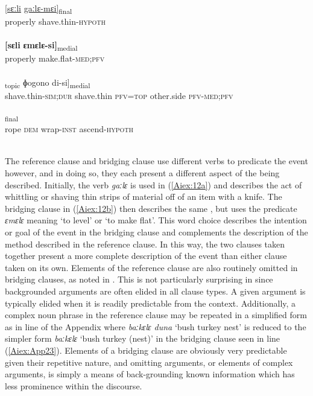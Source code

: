 \documentclass[output=paper]{LSP/langsci}
\begin{document}
\begin{exe}
\ex \label{Aiex:12ad}
\begin{xlist}
\ex \label{Aiex:12a}
\gll \underline{[sɛːli}	\underline{gaːlɛ-mɛi]}\textsubscript{final}\\
properly	shave.thin-\textsc{hypoth}\\
\glt {}\\
\ex \label{Aiex:12b}
\gll \textbf{[sɛli}	\textbf{ɛmɛlɛ-si]}\textsubscript{medial}\\
properly	make.flat-\textsc{med};\textsc{pfv}\\
\glt {}\\
\ex \label{Aiex:12c}
\gll [[gaːjɛ-liːː	gaːlɛ	di=jaː]\textsubscript{topic}	ɸogono	di-si]\textsubscript{medial}\\
shave.thin-\textsc{sim};\textsc{dur}	shave.thin	\textsc{pfv}=\textsc{top}	other.side	\textsc{pfv}-\textsc{med};\textsc{pfv}\\
\glt {}\\
\ex \label{Aiex:12d}
\textsubscript{final}\\
rope	\textsc{dem}	wrap-\textsc{inst}	ascend-\textsc{hypoth}\\
\glt	{}\\
\end{xlist}
\end{exe}

The reference clause and bridging clause use different verbs to predicate the event however, and in doing so, they each present a different aspect of the  being described. Initially, the verb  \textit{gaːlɛ} is used in (\ref{Aiex:12a}) and describes the act of whittling or shaving thin strips of material off of an item with a knife. The bridging clause in (\ref{Aiex:12b}) then describes the same , but uses the predicate \textit{ɛmɛlɛ} meaning `to level' or `to make flat'. This word choice describes the intention or goal of the event in the bridging clause and complements the description of the method described in the reference clause. In this way, the two clauses taken together present a more complete description of the event than either clause taken on its own. Elements of the reference clause are also routinely omitted in bridging clauses, as noted in . This is not particularly surprising in  since backgrounded arguments are often elided in all  clause types. A given argument is typically elided when it is readily predictable from the context. Additionally, a complex noun phrase in the reference clause may be repeated in a simplified form as in line  of the Appendix where \textit{baːkɛlɛ duna} `bush turkey nest' is reduced to the simpler form \textit{baːkɛlɛ} `bush turkey (nest)' in the bridging clause seen in line (\ref{Aiex:App23}). Elements of a bridging clause are obviously very predictable given their repetitive nature, and omitting arguments, or elements of complex arguments, is simply a means of back-grounding known information which has less prominence within the discourse.
\end{document}
